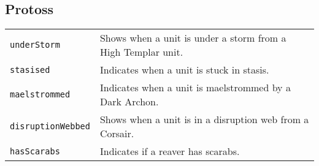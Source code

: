 \subsection{Protoss}
\begin{tabularx}{\textwidth}{lX}
\verb|underStorm| & Shows when a unit is under a storm from a High Templar unit. \\
\verb|stasised| & Indicates when a unit is stuck in stasis. \\
\verb|maelstrommed| & Indicates when a unit is maelstrommed by a Dark Archon. \\
\verb|disruptionWebbed| & Shows when a unit is in a disruption web from a Corsair. \\
 \verb|hasScarabs| & Indicates if a reaver has scarabs.\\
\end{tabularx} \\
